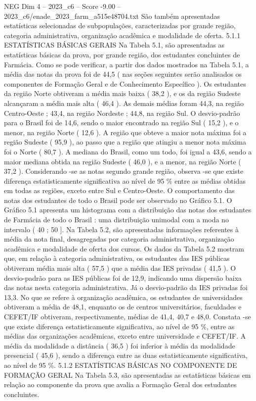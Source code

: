\begin{textsample}{NEG Dim 4 – 2023\_c6 – Score -9.00 – 2023\_c6/enade\_2023\_farm\_a515e48704.txt}
São também apresentadas estatísticas selecionadas de subpopulações, caracterizadas por grande região, categoria administrativa, organização acadêmica e modalidade de oferta. 5.1.1 ESTATÍSTICAS BÁSICAS GERAIS Na Tabela 5.1, são apresentadas as estatísticas básicas da prova, por grande região, dos estudantes concluintes de Farmácia.
Como se pode verificar, a partir dos dados mostrados na Tabela 5.1, a média das notas da prova foi de 44,5 ( nas seções seguintes serão analisados os componentes de Formação Geral e de Conhecimento Específico ).
Os estudantes da região Norte obtiveram a média mais baixa ( 38,2 ), e os da região Sudeste alcançaram a média mais alta ( 46,4 ).
As demais médias foram 44,3, na região Centro-Oeste ; 43,4, na região Nordeste ; 44,8, na região Sul.
O desvio-padrão para o Brasil foi de 14,6, sendo o maior encontrado na região Sul ( 15,2 ), e o menor, na região Norte ( 12,6 ).
A região que obteve a maior nota máxima foi a região Sudeste ( 95,9 ), ao passo que a região que atingiu a menor nota máxima foi o Norte ( 80,7 ).
A mediana do Brasil, como um todo, foi igual a 43,6, sendo a maior mediana obtida na região Sudeste ( 46,0 ), e a menor, na região Norte ( 37,2 ).
Considerando -se as notas segundo grande região, observa -se que existe diferença estatisticamente significativa ao nível de 95 \% entre as médias obtidas em todas as regiões, exceto entre Sul e Centro-Oeste.
O comportamento das notas dos estudantes de todo o Brasil pode ser observado no Gráfico 5.1.
O Gráfico 5.1 apresenta um histograma com a distribuição das notas dos estudantes de Farmácia de todo o Brasil : uma distribuição unimodal com a moda no intervalo ( 40 ; 50 ].
Na Tabela 5.2, são apresentadas informações referentes à média da nota final, desagregadas por categoria administrativa, organização acadêmica e modalidade de oferta dos cursos.
Os dados da Tabela 5.2 mostram que, em relação à categoria administrativa, os estudantes das IES públicas obtiveram média mais alta ( 57,5 ) que a média das IES privadas ( 41,5 ).
O desvio-padrão para as IES públicas foi de 12,9, indicando uma dispersão baixa das notas nesta categoria administrativa.
Já o desvio-padrão da IES privadas foi 13,3.
No que se refere à organização acadêmica, os estudantes de universidades obtiveram a média de 48,1, enquanto os de centros universitários, faculdades e CEFET/IF obtiveram, respectivamente, médias de 41,4, 40,7 e 48,0.
Constata -se que existe diferença estatisticamente significativa, ao nível de 95 \%, entre as médias das organizações acadêmicas, exceto entre universidade e CEFET/IF.
A média da modalidade a distância ( 36,5 ) foi inferior à média da modalidade presencial ( 45,6 ), sendo a diferença entre as duas estatisticamente significativa, ao nível de 95 \%. 5.1.2 ESTATÍSTICAS BÁSICAS NO COMPONENTE DE FORMAÇÃO GERAL Na Tabela 5.3, são apresentadas as estatísticas básicas em relação ao componente da prova que avalia a Formação Geral dos estudantes concluintes.

\end{textsample}
